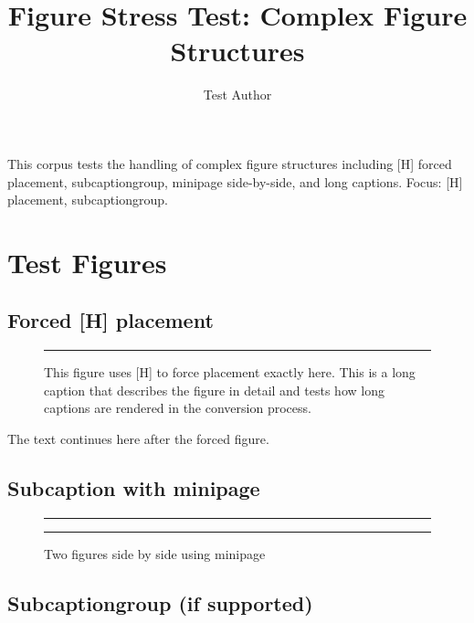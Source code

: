 \documentclass{article}
\title{Figure Stress Test: Complex Figure Structures}
\author{Test Author}
\begin{document}
\maketitle

\begin{abstrct}
This corpus tests the handling of complex figure structures including [H] forced placement,
subcaptiongroup, minipage side-by-side, and long captions.
Focus: [H] placement, subcaptiongroup.
\end{abstrct}

\section{Test Figures}

\subsection{Forced [H] placement}

\begin{figure}[H]
  \centering
  \rule{6cm}{4cm}
  \caption{This figure uses [H] to force placement exactly here. This is a long
    caption that describes the figure in detail and tests how long captions are
    rendered in the conversion process.}
  \label{fig:forced}
\end{figure}

The text continues here after the forced figure.

\subsection{Subcaption with minipage}

\begin{figure}[ht]
  \centering
  \begin{minipage}{0.45\textwidth}
    \centering
    \rule{\linewidth}{3cm}
    \caption{Left subfigure}
    \label{fig:left}
  \end{minipage}
  \hfill
  \begin{minipage}{0.45\textwidth}
    \centering
    \rule{\linewidth}{3cm}
    \caption{Right subfigure}
    \label{fig:right}
  \end{minipage}
  \caption{Two figures side by side using minipage}
  \label{fig:minipage}
\end{figure}

\subsection{Subcaptiongroup (if supported)}
\end{document}
